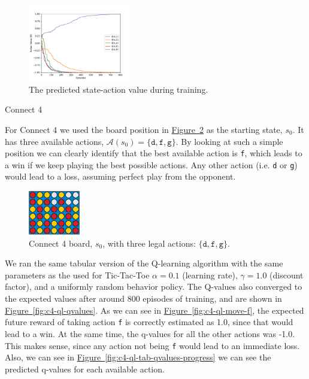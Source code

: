 \documentclass{article}
\newcommand{\GithubURL}[1]{[\href{https://github.com/davidrobles/mlnd-capstone-code/blob/master/#1}{source}]}
\begin{document}

\begin{figure}[!h]
    \centering
    \includegraphics[width=0.40\textwidth]{figures/tic_ql_tab_action_values.pdf}
    \caption{The predicted state-action value during training.}
    \label{fig:tic-ql-tab-qvalues-progress}
\end{figure}

Connect 4



For Connect 4 we used the board position in \hyperref[fig:c4-ql-tab-cur]
{Figure~\ref*{fig:c4-ql-tab-cur}} as the starting state, $s_0$. It has three available actions,
$\mathcal{A}(s_0) = \{\texttt{d}, \texttt{f}, \texttt{g}\}$. By looking at such a simple position we
can clearly identify that the best available action is \texttt{f}, which leads to a win if we keep
playing the best possible actions.  Any other action (i.e. \texttt{d} or \texttt{g}) would lead to a
loss, assuming perfect play from the opponent.


\begin{figure}[!h]
    \centering
    \includegraphics[width=0.2\textwidth]{figures/c4_ql_tab_current.pdf}
    \caption{Connect 4 board, $s_0$, with three legal actions: $\{\texttt{d}, \texttt{f}, \texttt{g}\}$.}
    \label{fig:c4-ql-tab-cur}
\end{figure}

We ran the same tabular version of the Q-learning algorithm with the same parameters as the used for
Tic-Tac-Toe $\alpha=0.1$ (learning rate), $\gamma=1.0$ (discount factor), and a uniformly random
behavior policy. The Q-values also converged to the expected values after around 800 episodes of
training, and are shown in \hyperref[fig:c4-ql-qvalues] {Figure~\ref*{fig:c4-ql-qvalues}}. As we can
see in \hyperref[fig:c4-ql-move-f] {Figure~\ref*{fig:c4-ql-move-f}}, the expected future reward of
taking action \texttt{f} is correctly estimated as 1.0, since that would lead to a win. At the same
time, the q-values for all the other actions was -1.0. This makes sense, since any action not being
\texttt{f} would lead to an immediate loss. Also, we can see in
\hyperref[fig:c4-ql-tab-qvalues-progress] {Figure~\ref*{fig:c4-ql-tab-qvalues-progress}} we can see
the predicted q-values for each available action. 
\end{document}
